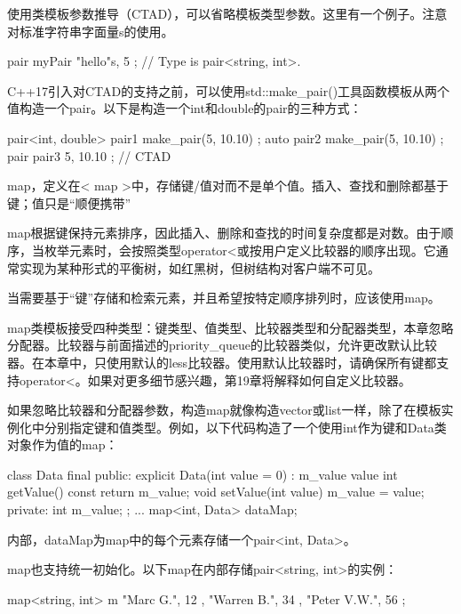使用类模板参数推导（CTAD），可以省略模板类型参数。这里有一个例子。注意对标准字符串字面量s的使用。

\begin{cpp}
pair myPair { "hello"s, 5 }; // Type is pair<string, int>.
\end{cpp}

C++17引入对CTAD的支持之前，可以使用std::make\_pair()工具函数模板从两个值构造一个pair。以下是构造一个int和double的pair的三种方式：

\begin{cpp}
pair<int, double> pair1 { make_pair(5, 10.10) };
auto pair2 { make_pair(5, 10.10) };
pair pair3 { 5, 10.10 }; // CTAD
\end{cpp}


map，定义在< map >中，存储键/值对而不是单个值。插入、查找和删除都基于键；值只是“顺便携带”

map根据键保持元素排序，因此插入、删除和查找的时间复杂度都是对数。由于顺序，当枚举元素时，会按照类型operator<或按用户定义比较器的顺序出现。它通常实现为某种形式的平衡树，如红黑树，但树结构对客户端不可见。

当需要基于“键”存储和检索元素，并且希望按特定顺序排列时，应该使用map。


map类模板接受四种类型：键类型、值类型、比较器类型和分配器类型，本章忽略分配器。比较器与前面描述的priority\_queue的比较器类似，允许更改默认比较器。在本章中，只使用默认的less比较器。使用默认比较器时，请确保所有键都支持operator<。如果对更多细节感兴趣，第19章将解释如何自定义比较器。

如果忽略比较器和分配器参数，构造map就像构造vector或list一样，除了在模板实例化中分别指定键和值类型。例如，以下代码构造了一个使用int作为键和Data类对象作为值的map：

\begin{cpp}
class Data final
{
    public:
        explicit Data(int value = 0) : m_value { value } { }
        int getValue() const { return m_value; }
        void setValue(int value) { m_value = value; }
    private:
        int m_value;
};
...
map<int, Data> dataMap;
\end{cpp}

内部，dataMap为map中的每个元素存储一个pair<int, Data>。

map也支持统一初始化。以下map在内部存储pair<string, int>的实例：

\begin{cpp}
map<string, int> m {
    { "Marc G.", 12 }, { "Warren B.", 34 }, { "Peter V.W.", 56 }
};
\end{cpp}

